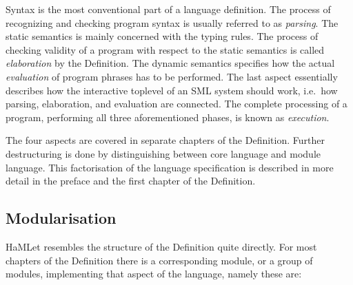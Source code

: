 \documentclass[twoside,titlepage]{article}
\begin{document}
Syntax is the most conventional part of a language definition. The process of recognizing and checking program syntax is usually referred to as {\em parsing}. The static semantics is mainly concerned with the typing rules. The process of checking validity of a program with respect to the static semantics is called {\em elaboration} by the Definition. The dynamic semantics specifies how the actual {\em evaluation} of program phrases has to be performed. The last aspect essentially describes how the interactive toplevel of an SML system should work, i.e.\ how parsing, elaboration, and evaluation are connected. The complete processing of a program, performing all three aforementioned phases, is known as {\em execution}.

The four aspects are covered in separate chapters of the Definition. Further destructuring is done by distinguishing between core language and module language. This factorisation of the language specification is described in more detail in the preface and the first chapter of the Definition.

%
%


\subsection{Modularisation}
\label{modularisation}

HaMLet resembles the structure of the Definition quite directly. For most chapters of the Definition there is a corresponding module, or a group of modules, implementing that aspect of the language, namely these are:
\end{document}
